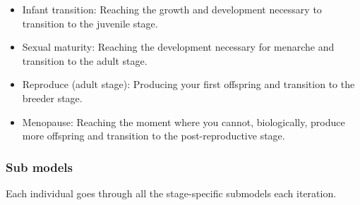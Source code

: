 \documentclass{article}
\begin{document}
\begin{itemize}
    \begin{itemize}
        \item Infant transition: Reaching the growth and development necessary to transition to the juvenile stage.
        \item Sexual maturity: Reaching the development necessary for menarche and transition to the adult stage.
        \item Reproduce (adult stage): Producing your first offspring and transition to the breeder stage.
        \item Menopause: Reaching the moment where you cannot, biologically, produce more offspring and transition to the post-reproductive stage.
    \end{itemize}
\end{itemize}

\subsubsection{Sub models}

Each individual goes through all the stage-specific submodels each iteration.
\end{document}

